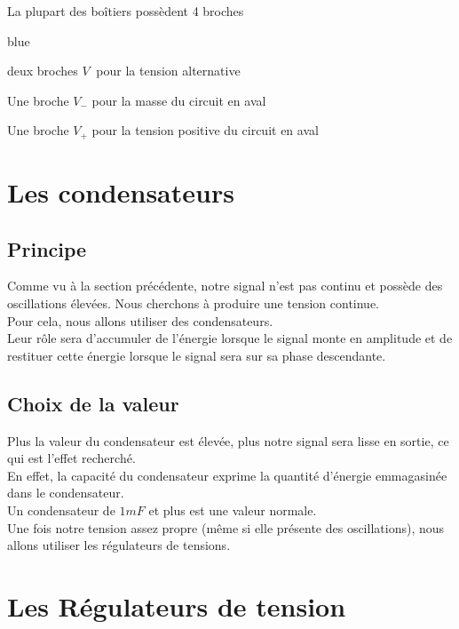     La plupart des boîtiers possèdent 4 broches

    \begin{items}{blue}{\Triangle}
      \item deux broches $V_{~}$ pour la tension alternative
      \item Une broche $V_-$ pour la masse du circuit en aval
      \item Une broche $V_+$ pour la tension positive du circuit en aval
   \end{items}



  \section{Les condensateurs}

  \subsection{Principe}
  Comme vu à la section précédente, notre signal n'est pas continu et possède des oscillations élevées.
  Nous cherchons à produire une tension continue.\\

  Pour cela, nous allons utiliser des condensateurs.\\

  Leur rôle sera d'accumuler de l'énergie lorsque le signal monte en amplitude et de restituer cette énergie lorsque le signal sera sur sa phase descendante.


  \subsection{Choix de la valeur}
  Plus la valeur du condensateur est élevée, plus notre signal sera lisse en sortie, ce qui est l'effet recherché.\\
  En effet, la capacité du condensateur exprime la quantité d'énergie emmagasinée dans le condensateur.\\

  Un condensateur de $1mF$ et plus est une valeur normale.\\
   Une fois notre tension assez propre (même si elle présente des oscillations), nous allons utiliser les régulateurs de tensions.

  \section{Les Régulateurs de tension}

